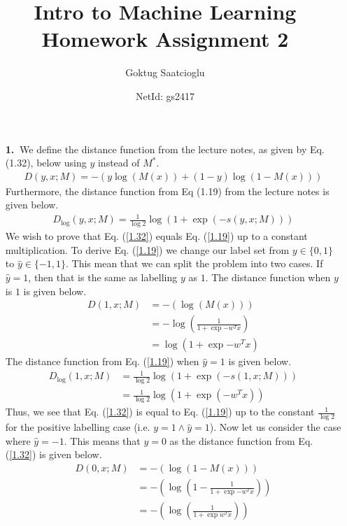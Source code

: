 \documentclass [10pt]{article}
\begin{document}
\title{Intro to Machine Learning Homework Assignment 2}
\author{Goktug Saatcioglu}
\date{NetId: gs2417}
\maketitle

\begin{enumerate}
	\item[\textbf{1.$\>$}]We define the distance function from the lecture notes, as given by Eq. (1.32), below using $y$ instead of $M^{*}$.
	\begin{align}
		\label{1.32} \tag{1.32} D(y,x;M) = -(y\log(M(x))+(1-y)\log(1-M(x)))
	\end{align}
	Furthermore, the distance function from Eq (1.19) from the lecture notes is given below.
	\begin{align}
		\label{1.19} \tag{1.19} D_{\log}(y,x;M) = \frac{1}{\log2}\log(1+\exp{(-s(y,x;M))})
	\end{align}
	We wish to prove that Eq. (\ref{1.32}) equals Eq. (\ref{1.19}) up to a constant multiplication. To derive Eq. (\ref{1.19}) we change our label set from $y\in\{0,1\}$ to $\hat{y}\in\{-1,1\}$. This mean that we can split the problem into two cases. If $\hat{y} = 1$, then that is the same as labelling $y$ as $1$. The distance function when $y$ is $1$ is given below.
	\begin{align}
		D(1,x;M) &= -(\log(M(x))) \nonumber \\
		&= -\log(\frac{1}{1+\exp{-w^{T}x}}) \nonumber \\
		&= \log(1+\exp{-w^{T}x}) \nonumber
	\end{align}
	The distance function from Eq. (\ref{1.19}) when $\hat{y} = 1$ is given below.
	\begin{align}
		D_{\log}(1,x;M) &= \frac{1}{\log2}\log(1+\exp{(-s(1,x;M))}) \nonumber \\
		&= \frac{1}{\log2}\log(1+\exp{(-w^{T}x)}) \nonumber
	\end{align}
	Thus, we see that Eq. (\ref{1.32}) is equal to Eq. (\ref{1.19}) up to the constant $\frac{1}{\log2}$ for the positive labelling case (i.e. $y = 1 \land \hat{y} = 1$). Now let us consider the case where $\hat{y} = -1$. This means that $y = 0$ as the distance function from Eq. (\ref{1.32}) is given below.
	\begin{align}
		D(0,x;M) &= -(\log(1-M(x))) \nonumber \\
		&= -(\log(1-\frac{1}{1+\exp{-w^{T}x}})) \nonumber \\
		&= -(\log(\frac{1}{1+\exp{w^{T}x}})) \nonumber \\

\end{align}
\end{enumerate}
\end{document}
